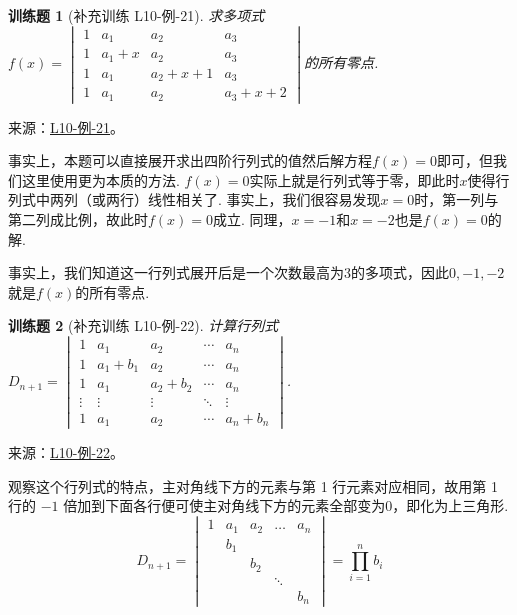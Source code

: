 \documentclass[12pt,fontset=fandol]{ctexart}
\newtheorem{exercise}{训练题}[section]
\begin{document}
\begin{exercise}[补充训练 L10-例-21]\label{prob:L10-例-21}
求多项式$f(x)=\begin{vmatrix}
            1 & a_1   & a_2     & a_3     \\
            1 & a_1+x & a_2     & a_3     \\
            1 & a_1   & a_2+x+1 & a_3     \\
            1 & a_1   & a_2     & a_3+x+2
        \end{vmatrix}$的所有零点.
\end{exercise}
\noindent 来源：\href{https://github.com/yhwu-is/Linear-Algebra-Left-Undone/blob/new/%E8%AE%B2%E4%B9%89/%E4%B8%93%E9%A2%98/10%20%E8%A1%8C%E5%88%97%E5%BC%8F.tex}{L10-例-21}。
\begin{solve}
事实上，本题可以直接展开求出四阶行列式的值然后解方程$f(x)=0$即可，但我们这里使用更为本质的方法. $f(x)=0$实际上就是行列式等于零，即此时$x$使得行列式中两列（或两行）线性相关了. 事实上，我们很容易发现$x=0$时，第一列与第二列成比例，故此时$f(x)=0$成立. 同理，$x=-1$和$x=-2$也是$f(x)=0$的解.

    事实上，我们知道这一行列式展开后是一个次数最高为3的多项式，因此$0,-1,-2$就是$f(x)$的所有零点.
\end{solve}

\begin{exercise}[补充训练 L10-例-22]\label{prob:L10-例-22}
计算行列式$D_{n+1}=\begin{vmatrix}
            1      & a_{1}       & a_{2}       & \cdots & a_n       \\
            1      & a_{1}+b_{1} & a_{2}       & \cdots & a_n       \\
            1      & a_{1}       & a_{2}+b_{2} & \cdots & a_n       \\
            \vdots & \vdots      & \vdots      & \ddots & \vdots    \\
            1      & a_{1}       & a_{2}       & \cdots & a_n+b_{n}
        \end{vmatrix}$.
\end{exercise}
\noindent 来源：\href{https://github.com/yhwu-is/Linear-Algebra-Left-Undone/blob/new/%E8%AE%B2%E4%B9%89/%E4%B8%93%E9%A2%98/10%20%E8%A1%8C%E5%88%97%E5%BC%8F.tex}{L10-例-22}。
\begin{solve}
观察这个行列式的特点，主对角线下方的元素与第 1 行元素对应相同，故用第 1 行的 $-1$ 倍加到下面各行便可使主对角线下方的元素全部变为0，即化为上三角形.
    \[ D_{n+1}=\begin{vmatrix}
            1 & a_{1} & a_{2} & \ldots & a_n   \\
              & b_{1} &       &        &       \\
              &       & b_{2} &        &       \\
              &       &       & \ddots &       \\
              &       &       &        & b_{n}
        \end{vmatrix}=\prod_{i=1}^n b_i \]
\end{solve}
\end{document}

